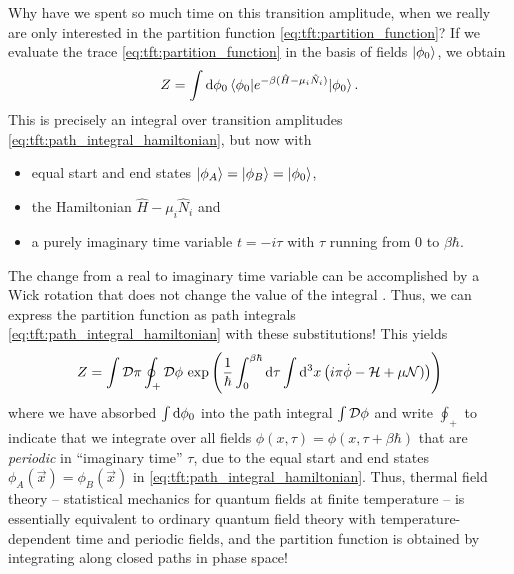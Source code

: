 Why have we spent so much time on this transition amplitude, when we really are only interested in the partition function \eqref{eq:tft:partition_function}?
If we evaluate the trace \eqref{eq:tft:partition_function} in the basis of fields $\ket{\phi_0}$, we obtain
\begin{equation}
	Z = \int \mathop{}\!\mathrm{d} \phi_0 \braket{\phi_0 | e^{-\beta (\hat{H} - \mu_i \hat{N}_i)} | \phi_0} .
\end{equation}
This is precisely an integral over transition amplitudes \eqref{eq:tft:path_integral_hamiltonian}, but now with 
\begin{itemize}
\item equal start and end states $\ket{\phi_A} = \ket{\phi_B} = \ket{\phi_0}$, 
\item the Hamiltonian $\hat{H} - \mu_i \hat{N}_i$ and 
\item a purely imaginary time variable $t = -i \tau$ with $\tau$ running from $0$ to $\beta \hbar$.
\end{itemize}
The change from a real to imaginary time variable can be accomplished by a Wick rotation that does not change the value of the integral .
Thus, we can express the partition function as path integrals \eqref{eq:tft:path_integral_hamiltonian} with these substitutions!
This yields
\begin{equation}
	Z = \int \mathcal{D} \pi \oint_+ \mathcal{D} \phi \, \exp \left( \frac{1}{\hbar} \int_0^{\beta \hbar} \mathop{}\!\mathrm{d} \tau \int \mathop{}\!\mathrm{d}^3 x \left( i \pi \dot{\phi} - \mathcal{H} + \mu \mathcal{N}) \right) \right)
\label{eq:tft:bosonic_partition_function}
\end{equation}
where we have absorbed $\int \mathop{}\!\mathrm{d} \phi_0$ into the path integral $\int \mathcal{D} \phi$ and write $\oint_+$ to indicate that we integrate over all fields $\phi(x, \tau) = \phi(x, \tau + \beta \hbar)$ that are \emph{periodic} in ``imaginary time'' $\tau$, due to the equal start and end states $\phi_A(\vec{x}) = \phi_B(\vec{x})$ in \cref{eq:tft:path_integral_hamiltonian}.
Thus, thermal field theory -- statistical mechanics for quantum fields at finite temperature -- is essentially equivalent to ordinary quantum field theory with temperature-dependent time and periodic fields, and the partition function is obtained by integrating along closed paths in phase space!

